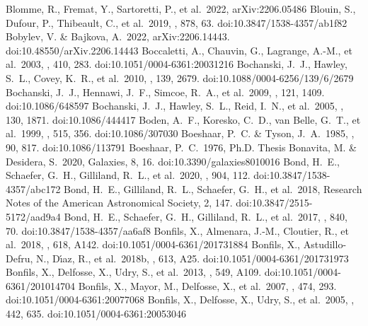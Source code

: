 \documentclass[twocolumn,tighten,twocolappendix]{aastex631}
\begin{document}
\begin{thebibliography}{}
 Blomme, R., Fremat, Y., Sartoretti, P., et al.\ 2022, arXiv:2206.05486
 Blouin, S., Dufour, P., Thibeault, C., et al.\ 2019, \apj, 878, 63. doi:10.3847/1538-4357/ab1f82
 Bobylev, V. \& Bajkova, A.\ 2022, arXiv:2206.14443. doi:10.48550/arXiv.2206.14443
 Boccaletti, A., Chauvin, G., Lagrange, A.-M., et al.\ 2003, \aap, 410, 283. doi:10.1051/0004-6361:20031216
 Bochanski, J.~J., Hawley, S.~L., Covey, K.~R., et al.\ 2010, \aj, 139, 2679. doi:10.1088/0004-6256/139/6/2679
 Bochanski, J.~J., Hennawi, J.~F., Simcoe, R.~A., et al.\ 2009, \pasp, 121, 1409. doi:10.1086/648597
 Bochanski, J.~J., Hawley, S.~L., Reid, I.~N., et al.\ 2005, \aj, 130, 1871. doi:10.1086/444417
 Boden, A.~F., Koresko, C.~D., van Belle, G.~T., et al.\ 1999, \apj, 515, 356. doi:10.1086/307030
 Boeshaar, P.~C. \& Tyson, J.~A.\ 1985, \aj, 90, 817. doi:10.1086/113791
 Boeshaar, P.~C.\ 1976, Ph.D. Thesis
 Bonavita, M. \& Desidera, S.\ 2020, Galaxies, 8, 16. doi:10.3390/galaxies8010016
 Bond, H.~E., Schaefer, G.~H., Gilliland, R.~L., et al.\ 2020, \apj, 904, 112. doi:10.3847/1538-4357/abc172
 Bond, H.~E., Gilliland, R.~L., Schaefer, G.~H., et al.\ 2018, Research Notes of the American Astronomical Society, 2, 147. doi:10.3847/2515-5172/aad9a4
 Bond, H.~E., Schaefer, G.~H., Gilliland, R.~L., et al.\ 2017, \apj, 840, 70. doi:10.3847/1538-4357/aa6af8
 Bonfils, X., Almenara, J.-M., Cloutier, R., et al.\ 2018, \aap, 618, A142. doi:10.1051/0004-6361/201731884
 Bonfils, X., Astudillo-Defru, N., D{\'\i}az, R., et al.\ 2018b, \aap, 613, A25. doi:10.1051/0004-6361/201731973
 Bonfils, X., Delfosse, X., Udry, S., et al.\ 2013, \aap, 549, A109. doi:10.1051/0004-6361/201014704
 Bonfils, X., Mayor, M., Delfosse, X., et al.\ 2007, \aap, 474, 293. doi:10.1051/0004-6361:20077068
 Bonfils, X., Delfosse, X., Udry, S., et al.\ 2005, \aap, 442, 635. doi:10.1051/0004-6361:20053046

\end{thebibliography}
\end{document}
